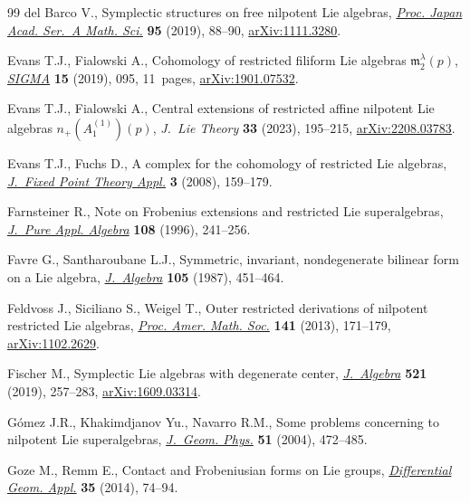 \documentclass[pdftex]{sigma}
\numberwithin{equation}{section}
\begin{document}
\begin{thebibliography}{99}
del Barco V., Symplectic structures on free nilpotent {L}ie algebras,
 \href{https://doi.org/10.3792/pjaa.95.88}{\textit{Proc. Japan Acad. Ser.~A Math. Sci.}} \textbf{95} (2019), 88--90,
 \href{https://arxiv.org/abs/1111.3280}{arXiv:1111.3280}.

Evans T.J., Fialowski A., Cohomology of restricted filiform {L}ie algebras
 {${\mathfrak{m}}_2^\lambda(p)$}, \href{https://doi.org/10.3842/SIGMA.2019.095}{\textit{SIGMA}} \textbf{15} (2019), 095,
 11~pages, \href{https://arxiv.org/abs/1901.07532}{arXiv:1901.07532}.

Evans T.J., Fialowski A., Central extensions of restricted affine nilpotent
 {L}ie algebras {$n_+(A^{(1)}_1)(p)$}, \textit{J.~Lie Theory} \textbf{33}
 (2023), 195--215, \href{https://arxiv.org/abs/2208.03783}{arXiv:2208.03783}.

Evans T.J., Fuchs D., A complex for the cohomology of restricted {L}ie
 algebras, \href{https://doi.org/10.1007/s11784-008-0060-y}{\textit{J.~Fixed Point Theory Appl.}} \textbf{3} (2008), 159--179.

Farnsteiner R., Note on {F}robenius extensions and restricted {L}ie
 superalgebras, \href{https://doi.org/10.1016/0022-4049(95)00077-1}{\textit{J.~Pure Appl. Algebra}} \textbf{108} (1996), 241--256.

Favre G., Santharoubane L.J., Symmetric, invariant, nondegenerate bilinear form
 on a {L}ie algebra, \href{https://doi.org/10.1016/0021-8693(87)90209-2}{\textit{J.~Algebra}} \textbf{105} (1987), 451--464.

Feldvoss J., Siciliano S., Weigel T., Outer restricted derivations of nilpotent
 restricted {L}ie algebras, \href{https://doi.org/10.1090/S0002-9939-2012-11316-4}{\textit{Proc. Amer. Math. Soc.}} \textbf{141}
 (2013), 171--179, \href{https://arxiv.org/abs/1102.2629}{arXiv:1102.2629}.

Fischer M., Symplectic {L}ie algebras with degenerate center,
 \href{https://doi.org/10.1016/j.jalgebra.2018.11.038}{\textit{J.~Algebra}} \textbf{521} (2019), 257--283, \href{https://arxiv.org/abs/1609.03314}{arXiv:1609.03314}.

G\'omez J.R., Khakimdjanov Yu., Navarro R.M., Some problems concerning to
 nilpotent {L}ie superalgebras, \href{https://doi.org/10.1016/j.geomphys.2004.01.003}{\textit{J.~Geom. Phys.}} \textbf{51} (2004),
 472--485.

Goze M., Remm E., Contact and {F}robeniusian forms on {L}ie groups,
 \href{https://doi.org/10.1016/j.difgeo.2014.05.008}{\textit{Differential Geom. Appl.}} \textbf{35} (2014), 74--94.


\end{thebibliography}
\end{document}

